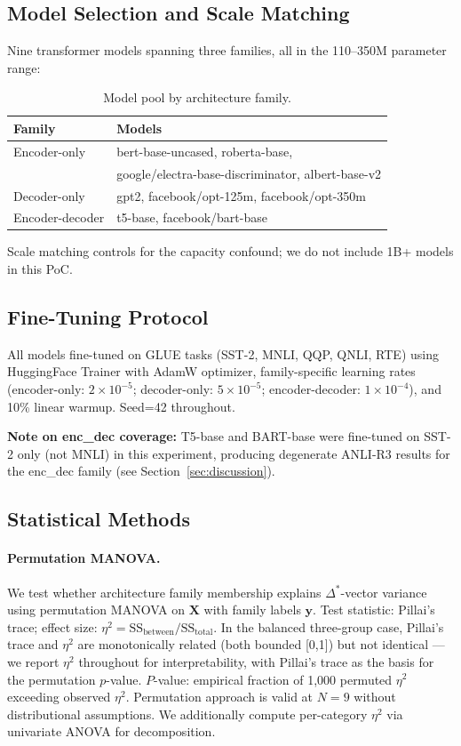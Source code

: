 \subsection{Model Selection and Scale Matching}

Nine transformer models spanning three families, all in the 110--350M parameter range:

\begin{table}[h]
\centering
\caption{Model pool by architecture family.}
\begin{tabular}{ll}
\toprule
\textbf{Family} & \textbf{Models} \\
\midrule
Encoder-only & bert-base-uncased, roberta-base, \\
             & google/electra-base-discriminator, albert-base-v2 \\
Decoder-only & gpt2, facebook/opt-125m, facebook/opt-350m \\
Encoder-decoder & t5-base, facebook/bart-base \\
\bottomrule
\end{tabular}
\end{table}

Scale matching controls for the capacity confound; we do not include 1B+ models in this PoC.

\subsection{Fine-Tuning Protocol}

All models fine-tuned on GLUE tasks (SST-2, MNLI, QQP, QNLI, RTE) using HuggingFace Trainer
with AdamW optimizer, family-specific learning rates (encoder-only: $2 \times 10^{-5}$;
decoder-only: $5 \times 10^{-5}$; encoder-decoder: $1 \times 10^{-4}$), and 10\% linear warmup.
Seed=42 throughout.

\textbf{Note on enc\_dec coverage:} T5-base and BART-base were fine-tuned on SST-2 only (not
MNLI) in this experiment, producing degenerate ANLI-R3 results for the enc\_dec family
(see Section~\ref{sec:discussion}).

\subsection{Statistical Methods}

\paragraph{Permutation MANOVA.}
We test whether architecture family membership explains $\Delta^*$-vector variance using
permutation MANOVA on $\mathbf{X}$ with family labels $\mathbf{y}$. Test statistic: Pillai's
trace; effect size: $\eta^2 = \text{SS}_\text{between}/\text{SS}_\text{total}$. In the balanced
three-group case, Pillai's trace and $\eta^2$ are monotonically related (both bounded [0,1]) but
not identical --- we report $\eta^2$ throughout for interpretability, with Pillai's trace as the
basis for the permutation $p$-value. $P$-value: empirical fraction of 1,000 permuted $\eta^2$
exceeding observed $\eta^2$. Permutation approach is valid at $N=9$ without distributional
assumptions. We additionally compute per-category $\eta^2$ via univariate ANOVA for decomposition.

